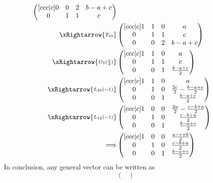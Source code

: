 \begin{exm}
\begin{align*}
\begin{pmatrix}[ccc|c]
			0 & 0 & 2 & b-a+c \\
			0 & 1 & 1 & c
		\end{pmatrix}                                                                 \\
		\xRightarrow{\substack{T_{23}}}
		 & \begin{pmatrix}[ccc|c]
			1 & 1 & 0 & a     \\
			0 & 1 & 1 & c     \\
			0 & 0 & 2 & b-a+c
		\end{pmatrix}                                                                 \\
		\xRightarrow{\substack{D_3(\frac{1}{2})}}
		 & \begin{pmatrix}[ccc|c]
			1 & 1 & 0 & a               \\
			0 & 1 & 1 & c               \\
			0 & 0 & 1 & \frac{b-a+c}{2}
		\end{pmatrix}                                                                 \\
		\xRightarrow{\substack{L_{23}(-1)}}
		 & \begin{pmatrix}[ccc|c]
			1 & 1 & 0 & a                            \\
			0 & 1 & 0 & \frac{2c}{2}-\frac{b-a+c}{2} \\
			0 & 0 & 1 & \frac{b-a+c}{2}
		\end{pmatrix}                                                                 \\
		\xRightarrow{\substack{L_{12}(-1)}}
		 & \begin{pmatrix}[ccc|c]
			1 & 0 & 0 & \frac{2a}{2}-\frac{c-b+a}{2} \\
			0 & 1 & 0 & \frac{c-b+a}{2}              \\
			0 & 0 & 1 & \frac{b-a+c}{2}
		\end{pmatrix}                                                                 \\
		\Longrightarrow
		 & \begin{pmatrix}[ccc|c]
			1 & 0 & 0 & \frac{a-c+b}{2} \\
			0 & 1 & 0 & \frac{c-b+a}{2} \\
			0 & 0 & 1 & \frac{b-a+c}{2}
		\end{pmatrix}
	\end{align*}
	In conclusion, any general vector can be written as
	\begin{equation*}
		\begin{pmatrix}

\end{pmatrix}
\end{equation*}
\end{exm}
